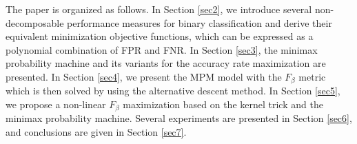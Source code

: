 \documentclass[15pt]{article}
\begin{document}
The paper is organized as follows.
In Section \ref{sec2}, we introduce several non-decomposable performance measures for binary classification
and derive their equivalent minimization objective functions, which can be expressed as a polynomial combination
of FPR and FNR. In Section \ref{sec3}, the minimax probability machine and its variants for the accuracy rate
maximization are presented. In Section \ref{sec4}, we present the MPM model with the $F_\beta$ metric which is 
then solved by using the alternative descent method. In Section \ref{sec5}, we propose a non-linear $F_\beta$ 
maximization based on the kernel trick and the minimax probability machine. 
Several experiments are presented in Section \ref{sec6}, and conclusions are given in Section \ref{sec7}.

\begin{table*}
\caption{Non-decomposable Performance Measures: AR, AM, QM, $F_\beta$, HM, GM, G-TP/PR, JAC (first column),
their definition (second column) and their equivalent minimization objective function given in terms of 
a polynomial combination of FPR and FNR (third column)}\label{NDMeasures}
\begin{center}
\begin{small}
\begin{sc}
\end{sc}
\end{small}
\end{center}
\end{table*}
\end{document}

